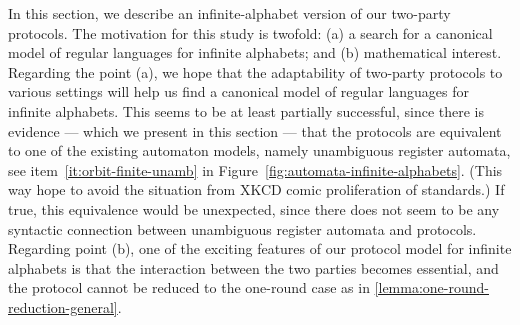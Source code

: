 In this section, we describe an infinite-alphabet version of our two-party
protocols. The motivation for this study is twofold: (a) a search for a
canonical model of regular languages for infinite alphabets; and (b)
mathematical interest. Regarding the point (a), we hope that the adaptability
of two-party protocols to various settings will help us  find a canonical model
of regular languages for infinite alphabets. This seems to be at least
partially successful, since there is evidence --- which we present in this
section --- that the protocols are equivalent to one of the existing automaton
models, namely unambiguous register automata, see
item~\ref{it:orbit-finite-unamb} in
Figure~\ref{fig:automata-infinite-alphabets}. (This way hope to avoid the
situation from XKCD comic proliferation of standards.) If true, this
equivalence would be unexpected, since there does not seem to be any syntactic
connection between unambiguous register automata and protocols. Regarding point
(b), one of the exciting features of our protocol model for infinite alphabets
is that the interaction between the two parties becomes essential, and the
protocol cannot be reduced to the one-round case as in
\cref{lemma:one-round-reduction-general}.

